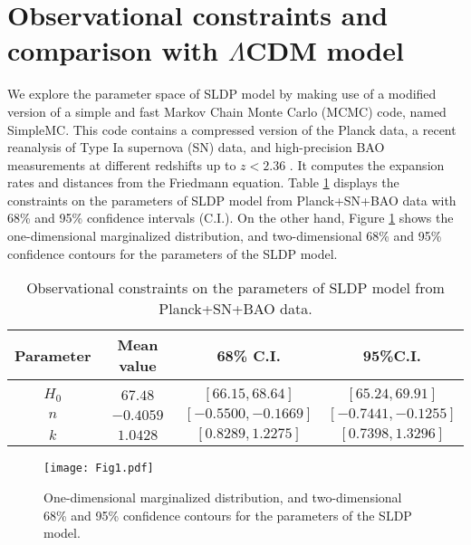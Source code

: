 \documentclass[11pt,a4paper]{article}
\begin{document}
\pagebreak

\section{Observational constraints and comparison with $\Lambda$CDM model}\label{sec3}
We explore the parameter space of SLDP model by making use of a modified version of a simple and fast Markov
Chain Monte Carlo (MCMC) code, named SimpleMC.  This code contains a compressed version of the Planck data, a recent reanalysis of Type Ia supernova
(SN) data, and high-precision BAO measurements at different redshifts up to $z < 2.36$ \cite{aub14}. It computes the expansion rates and distances from the Friedmann equation. Table \ref{tab:results} displays the constraints on the parameters of SLDP model from Planck+SN+BAO data with 68\% and 95\% confidence intervals (C.I.). On the other hand, Figure \ref{fig1} shows the one-dimensional marginalized distribution, and two-dimensional 68\% and 95\% confidence contours for the parameters of the SLDP model.





\begin{table}[h]
 \caption{Observational constraints on the parameters of SLDP model from Planck+SN+BAO data.} 
\begin{center}
\begin{tabular}{cccc}
\hline\hline Parameter&Mean value&68\% C.I.&95\%C.I.\\ \hline \\
$H_0$	& $ 67.48$& $[66.15,68.64]$&$[65.24,69.91]$ \\[8pt]
$n$&  $-0.4059$&$[-0.5500, -0.1669]$&$[-0.7441, -0.1255]$ \\[8pt]
$k$&$1.0428$ &$[0.8289,1.2275]$&$[0.7398,  1.3296]$ \\[8pt]
\hline\hline
\end{tabular}
\label{tab:results}
\end{center}
\end{table}

\begin{figure}[htb!]\centering
\texttt{[image: Fig1.pdf]}
\caption{\footnotesize{One-dimensional marginalized distribution, and two-dimensional 68\%  and 95\% confidence contours for the parameters of the SLDP model. }}
\label{fig1}
\end{figure}
\end{document}
